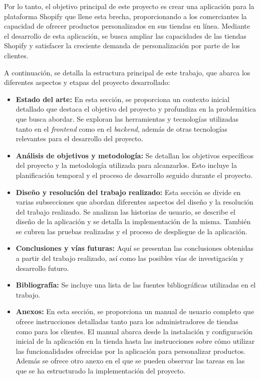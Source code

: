 \documentclass[12pt]{article}
\begin{document}
Por lo tanto, el objetivo principal de este proyecto es crear una aplicación para la plataforma Shopify que llene esta brecha, proporcionando a los comerciantes 
la capacidad de ofrecer productos personalizados en sus tiendas en línea. Mediante el desarrollo de esta aplicación, se busca ampliar las capacidades 
de las tiendas Shopify y satisfacer la creciente demanda de personalización por parte de los clientes.

A continuación, se detalla la estructura principal de este trabajo, que abarca los diferentes aspectos y etapas del proyecto desarrollado:

\begin{itemize}
    \item \textbf{Estado del arte:} En esta sección, se proporciona un contexto inicial detallado que destaca el objetivo del proyecto y profundiza
    en la problemática que busca abordar. Se exploran las herramientas y tecnologías utilizadas tanto en el \textit{frontend} como en el \textit{backend}, además 
    de otras tecnologías relevantes para el desarrollo del proyecto.
    
    \item \textbf{Análisis de objetivos y metodología:} Se detallan los objetivos específicos del proyecto y la metodología utilizada para alcanzarlos.
    Esto incluye la planificación temporal y el proceso de desarrollo seguido durante el proyecto.
    
    \item \textbf{Diseño y resolución del trabajo realizado:} Esta sección se divide en varias subsecciones que abordan diferentes aspectos
    del diseño y la resolución del trabajo realizado. Se analizan las historias de usuario, se describe el diseño de la aplicación y se detalla
    la implementación de la misma. También se cubren las pruebas realizadas y el proceso de despliegue de la aplicación.
    
    \item \textbf{Conclusiones y vías futuras:} Aquí se presentan las conclusiones obtenidas a partir del trabajo realizado, así como las posibles
    vías de investigación y desarrollo futuro.
    
    \item \textbf{Bibliografía:} Se incluye una lista de las fuentes bibliográficas utilizadas en el trabajo.
    
    \item \textbf{Anexos:} En esta sección, se proporciona un manual de usuario completo que ofrece instrucciones detalladas tanto para los
    administradores de tiendas como para los clientes. El manual abarca desde la instalación y configuración inicial de la aplicación en la 
    tienda hasta las instrucciones sobre cómo utilizar las funcionalidades ofrecidas por la aplicación para personalizar productos.
    Además se ofrece otro anexo en el que se pueden observar las tareas en las que se ha estructurado la implementación del proyecto.

\end{itemize}
\end{document}
